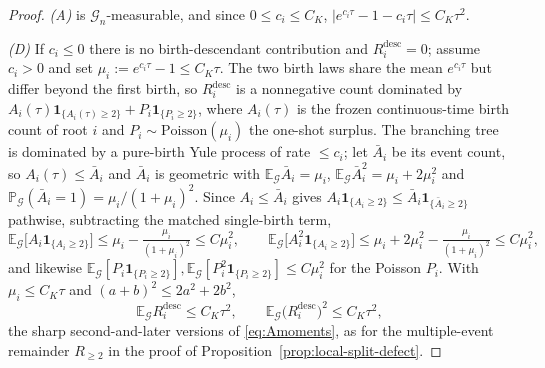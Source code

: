 \documentclass[a4paper,fleqn]{cas-sc}
\theoremstyle{definition}
\theoremstyle{remark}
\begin{document}
\begin{proof}
\emph{(A)} is $\mathcal G_n$-measurable, and since $0\le c_i\le C_K$,
$\bigl|e^{c_i\tau}-1-c_i\tau\bigr|\le C_K\tau^2$.

\emph{(D)} If $c_i\le0$ there is no birth-descendant contribution and $R^{\mathrm{desc}}_i=0$;
assume $c_i>0$ and set $\mu_i:=e^{c_i\tau}-1\le C_K\tau$. The two birth laws share the mean
$e^{c_i\tau}$ but differ beyond the first birth, so $R^{\mathrm{desc}}_i$ is a nonnegative count
dominated by $A_i(\tau)\mathbf 1_{\{A_i(\tau)\ge2\}}+P_i\mathbf 1_{\{P_i\ge2\}}$, where $A_i(\tau)$
is the frozen continuous-time birth count of root $i$ and $P_i\sim\mathrm{Poisson}(\mu_i)$ the
one-shot surplus. The branching tree is dominated by a pure-birth Yule process of rate $\le c_i$;
let $\bar A_i$ be its event count, so $A_i(\tau)\le\bar A_i$ and $\bar A_i$ is geometric with
$\mathbb E_{\mathcal G}\bar A_i=\mu_i$, $\mathbb E_{\mathcal G}\bar A_i^2=\mu_i+2\mu_i^2$ and
$\mathbb P_{\mathcal G}(\bar A_i=1)=\mu_i/(1+\mu_i)^2$. Since $A_i\le\bar A_i$ gives
$A_i\mathbf 1_{\{A_i\ge2\}}\le\bar A_i\mathbf 1_{\{\bar A_i\ge2\}}$ pathwise, subtracting the matched
single-birth term,
\[
\mathbb E_{\mathcal G}\bigl[A_i\mathbf 1_{\{A_i\ge2\}}\bigr]\le\mu_i-\tfrac{\mu_i}{(1+\mu_i)^2}\le C\mu_i^2,
\qquad
\mathbb E_{\mathcal G}\bigl[A_i^2\mathbf 1_{\{A_i\ge2\}}\bigr]\le\mu_i+2\mu_i^2-\tfrac{\mu_i}{(1+\mu_i)^2}\le C\mu_i^2,
\]
and likewise $\mathbb E_{\mathcal G}[P_i\mathbf 1_{\{P_i\ge2\}}],\mathbb E_{\mathcal G}[P_i^2\mathbf 1_{\{P_i\ge2\}}]\le C\mu_i^2$
for the Poisson $P_i$. With $\mu_i\le C_K\tau$ and $(a+b)^2\le2a^2+2b^2$,
\[
\mathbb E_{\mathcal G}R^{\mathrm{desc}}_i\le C_K\tau^2,
\qquad
\mathbb E_{\mathcal G}\bigl(R^{\mathrm{desc}}_i\bigr)^2\le C_K\tau^2,
\]
the sharp second-and-later versions of \eqref{eq:Amoments}, as for the multiple-event
remainder $R_{\ge2}$ in the proof of Proposition~\ref{prop:local-split-defect}.


\end{proof}
\end{document}
